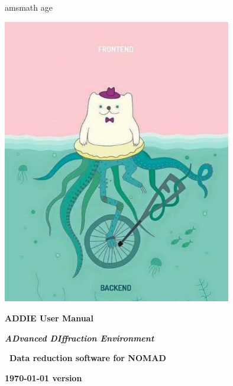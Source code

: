 \documentclass{report}
\begin{document}
{\let\cleardoublep\usepackage{amsmath}
age\clearpage 
\begin{titlepage}
	\centering
	\includegraphics[width=0.75\textwidth]{graphics/joke_image.jpg}\par\vspace{1cm}
	\vspace{2cm}
	{\huge\bfseries ADDIE User Manual\par}
	{\LARGE\bfseries\itshape ADvanced DIffraction Environment\par}
	\vspace{1cm}
	{\Large\bfseries\ Data reduction software for NOMAD\par}
	\vfill
	{\large\bfseries \today{} version \par}
\end{titlepage}
 

 \tableofcontents

}

 


\end{document}
